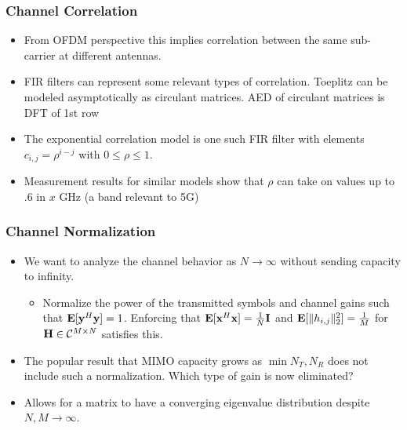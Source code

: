 \documentclass[10pt,tgadventor, onlymath]{beamer}
\begin{document}
\begin{frame}
\frametitle{Channel Correlation}
	\begin{itemize}
		\item 
			From OFDM perspective this implies correlation between the same sub-carrier at different antennas.
		\item 
			FIR filters can represent some relevant types of correlation.
			Toeplitz can be modeled asymptotically as circulant matrices. AED of circulant matrices is DFT of 1st row
		\item
			The exponential correlation model is one such FIR filter with elements $c_{i,j} = \rho^{i-j} $ with $ 0 \leq \rho \leq 1$.
		\item 
			Measurement results for similar models show that $\rho$ can take on values up to $.6$ in $x$ GHz (a band relevant to 5G)
	\end{itemize}
\end{frame}

\begin{frame}
\frametitle{Channel Normalization}
\begin{itemize}
\item
	We want to analyze the channel behavior as $N \rightarrow \infty$ without sending capacity to infinity. 
\begin{itemize}
\item
	Normalize the power of the transmitted symbols and channel gains such that $\mathop{\bf E{}}[\mathbf{y}^H \mathbf{y} ] = 1$.
	Enforcing that $\mathop{\bf E{}}[\mathbf{x}^H \mathbf{x} ] = \frac{1}{N}\mathbf{I}$ and $\mathop{\bf E{}}[\|h_{i,j}\|^2_2 ]= \frac{1}{M}$ for $\mathbf{H} \in \mathcal{C}^{M \times N} $ satisfies this.
\end{itemize}
\item
	The popular result that MIMO capacity grows as $\min{N_T, N_R}$ does not include such a normalization. Which type of gain is now eliminated?
\item
	Allows for a matrix to have a converging eigenvalue distribution despite $N, M \rightarrow \infty$.
\end{itemize}
\end{frame}
\end{document}
